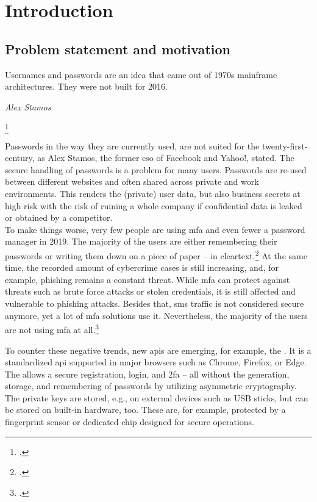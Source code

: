 \chapter{Introduction}
\label{chapter:introduction}

\section{Problem statement and motivation}

\setlength{}
\epigraph{\frqq Usernames and passwords are an idea that came out of 1970s mainframe architectures. They were not built for 2016.\flqq\footnotemark}{\textit{Alex Stamos}}
\footcitetext[See][]{stamos}

Passwords in the way they are currently used, are not suited for the twenty-first-century, as Alex Stamos, the former \gls{cso} of Facebook and Yahoo!, stated. The secure handling of passwords is a problem for many users. Passwords are re-used between different websites and often shared across private and work environments. This renders the (private) user data, but also business secrets at high risk with the risk of ruining a whole company if confidential data is leaked or obtained by a competitor.\\
To make things worse, very few people are using \gls{mfa} and even fewer a password manager in 2019. The majority of the users are either remembering their passwords or writing them down on a piece of paper -- in cleartext.\footcites[See][]{ibm-security}[See][]{web-de-passwords}
At the same time, the recorded amount of cybercrime cases is still increasing, and, for example, phishing remains a constant threat. While \gls{mfa} can protect against threats such as brute force attacks or stolen credentials, it is still affected and vulnerable to phishing attacks. Besides that, \gls{sms} traffic is not considered secure anymore, yet a lot of \gls{mfa} solutions use it. Nevertheless, the majority of the users are not using \gls{mfa} at all.\footcites[See][]{infratest-dimap}[See][6--7]{bka-cybercrime}

To counter these negative trends, new \glspl{api} are emerging, for example, the \wa. It is a standardized \gls{api} supported in major browsers such as Chrome, Firefox, or Edge. The \wa{} allows a secure registration, login, and \gls{2fa} -- all without the generation, storage, and remembering of passwords by utilizing asymmetric cryptography. The private keys are stored, e.g., on external devices such as USB sticks, but can be stored on built-in hardware, too. These are, for example, protected by a fingerprint sensor or dedicated chip designed for secure operations.

